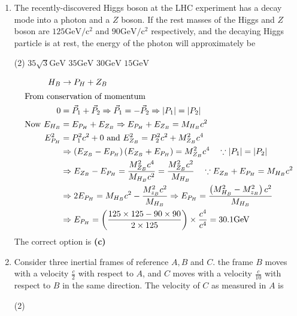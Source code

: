 \begin{enumerate}
	\item The recently-discovered Higgs boson at the LHC experiment has a decay mode into a photon and a $Z$ boson. If the rest masses of the Higgs and $Z$ boson are $125 \mathrm{GeV} / \mathrm{c}^{2}$ and $90 \mathrm{GeV} / \mathrm{c}^{2}$ respectively, and the decaying Higgs particle is at rest, the energy of the photon will approximately be
	{}

\begin{tasks}(2)
	\task[\textbf{A.}] $35 \sqrt{3} \mathrm{GeV}$
	\task[\textbf{B.}]$35 \mathrm{GeV}$
	\task[\textbf{C.}]$30 \mathrm{GeV}$
	\task[\textbf{D.}]$15 \mathrm{GeV}$
\end{tasks}
\begin{answer}
	\begin{align*}
	H_{B} &\rightarrow P_{H}+Z_{B}\\
	\intertext { From conservation of momentum }
	 0&=\vec{P}_{1}+\vec{P}_{2} \Rightarrow \vec{P}_{1}=-\vec{P}_{2} \Rightarrow\left|P_{1}\right|=\left|P_{2}\right|\\
	\text { Now } E_{H_{B}}&=E_{P_{H}}+E_{Z_{B}} \Rightarrow E_{P_{H}}+E_{Z_{B}}=M_{H_{B}} c^{2}\\
	E_{P_{H}}^{2}&=P_{1}^{2} c^{2}+0 \text { and } E_{Z_{B}}^{2}=P_{2}^{2} c^{2}+M_{Z_{B}}^{2} c^{4}\\
	&\Rightarrow\left(E_{Z_{B}}-E_{P_{H}}\right)\left(E_{Z_{B}}+E_{P_{H}}\right)=M_{Z_{B}}^{2} c^{4} \quad \because\left|P_{1}\right|=\left|P_{2}\right|\\
	&\Rightarrow E_{Z_{B}}-E_{P_{H}}=\frac{M_{Z_{B}}^{2} c^{4}}{M_{H_{B}} c^{2}}=\frac{M_{Z_{B}}^{2} c^{2}}{M_{H_{B}}} \quad \because E_{Z_{B}}+E_{P_{H}}=M_{H_{B}} c^{2}\\
	&\Rightarrow 2 E_{P_{H}}=M_{H_{B}} c^{2}-\frac{M_{z_{B}}^{2} c^{2}}{M_{H_{B}}} \Rightarrow E_{P_{H}}=\frac{\left(M_{H_{B}}^{2}-M_{z_{B}}^{2}\right) c^{2}}{M_{H_{B}}}\\
	&\Rightarrow E_{P_{H}}=\left(\frac{125 \times 125-90 \times 90}{2 \times 125}\right) \times \frac{c^{4}}{c^{4}}=30.1 \mathrm{GeV}
	\end{align*}
	The correct option is \textbf{(c)}
\end{answer}
	\item Consider three inertial frames of reference $A, B$ and $C$. the frame $B$ moves with a velocity $\frac{c}{2}$ with respect to $A$, and $C$ moves with a velocity $\frac{c}{10}$ with respect to $B$ in the same direction. The velocity of $C$ as measured in $A$ is
	{}
\begin{tasks}(2)

\end{tasks}
\end{enumerate}
